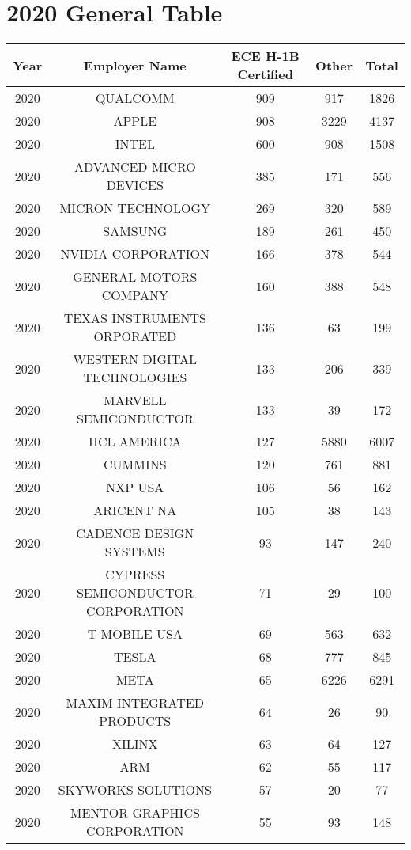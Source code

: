 \documentclass{article}%
\begin{document}
%
\normalsize%
\section{2020 General Table}%
\label{sec:2020GeneralTable}%
\begin{longtable}{c|c|c|c|c}%
\hline%
Year&Employer Name&ECE \newline%
 H{-}1B \newline%
 Certified&Other&Total\\%
\hline%
2020&QUALCOMM&909&917&1826\\%
\hline%
2020&APPLE&908&3229&4137\\%
\hline%
2020&INTEL&600&908&1508\\%
\hline%
2020&ADVANCED MICRO DEVICES&385&171&556\\%
\hline%
2020&MICRON TECHNOLOGY&269&320&589\\%
\hline%
2020&SAMSUNG&189&261&450\\%
\hline%
2020&NVIDIA CORPORATION&166&378&544\\%
\hline%
2020&GENERAL MOTORS COMPANY&160&388&548\\%
\hline%
2020&TEXAS INSTRUMENTS ORPORATED&136&63&199\\%
\hline%
2020&WESTERN DIGITAL TECHNOLOGIES&133&206&339\\%
\hline%
2020&MARVELL SEMICONDUCTOR&133&39&172\\%
\hline%
2020&HCL AMERICA&127&5880&6007\\%
\hline%
2020&CUMMINS&120&761&881\\%
\hline%
2020&NXP USA&106&56&162\\%
\hline%
2020&ARICENT NA&105&38&143\\%
\hline%
2020&CADENCE DESIGN SYSTEMS&93&147&240\\%
\hline%
2020&CYPRESS SEMICONDUCTOR CORPORATION&71&29&100\\%
\hline%
2020&T{-}MOBILE USA&69&563&632\\%
\hline%
2020&TESLA&68&777&845\\%
\hline%
2020&META&65&6226&6291\\%
\hline%
2020&MAXIM INTEGRATED PRODUCTS&64&26&90\\%
\hline%
2020&XILINX&63&64&127\\%
\hline%
2020&ARM&62&55&117\\%
\hline%
2020&SKYWORKS SOLUTIONS&57&20&77\\%
\hline%
2020&MENTOR GRAPHICS CORPORATION&55&93&148\\%
\hline%

\end{longtable}
\end{document}
